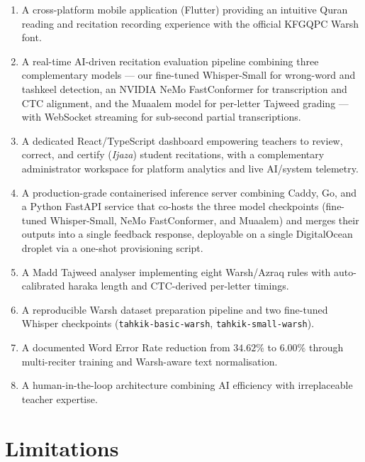 \begin{emeraldbox}[title=Key Contributions of the Tahkik Project]
\begin{enumerate}
  \item A cross-platform mobile application (Flutter) providing an
        intuitive Quran reading and recitation recording experience with
        the official KFGQPC Warsh font.
  \item A real-time AI-driven recitation evaluation pipeline combining
        three complementary models --- our fine-tuned Whisper-Small for
        wrong-word and tashkeel detection, an NVIDIA NeMo
        FastConformer for transcription and CTC alignment, and the
        Muaalem model for per-letter Tajweed grading --- with
        WebSocket streaming for sub-second partial transcriptions.
  \item A dedicated React/TypeScript dashboard empowering teachers to
        review, correct, and certify (\textit{Ijaza}) student
        recitations, with a complementary administrator workspace for
        platform analytics and live AI/system telemetry.
  \item A production-grade containerised inference server combining
        Caddy, Go, and a Python FastAPI service that co-hosts the three
        model checkpoints (fine-tuned Whisper-Small, NeMo
        FastConformer, and Muaalem) and merges their outputs into a
        single feedback response, deployable on a single DigitalOcean
        droplet via a one-shot provisioning script.
  \item A Madd Tajweed analyser implementing eight Warsh/Azraq rules
        with auto-calibrated haraka length and CTC-derived per-letter
        timings.
  \item A reproducible Warsh dataset preparation pipeline and two
        fine-tuned Whisper checkpoints (\texttt{tahkik-basic-warsh},
        \texttt{tahkik-small-warsh}).
  \item A documented Word Error Rate reduction from $34.62\%$ to
        $\mathbf{6.00\%}$ through multi-reciter training and Warsh-aware
        text normalisation.
  \item A human-in-the-loop architecture combining AI efficiency with
        irreplaceable teacher expertise.
\end{enumerate}
\end{emeraldbox}

\section*{Limitations}

